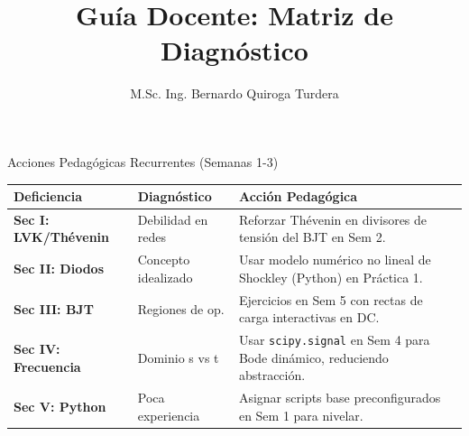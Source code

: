\documentclass[aspectratio=169]{beamer}
\title{Guía Docente: Matriz de Diagnóstico}
\author{M.Sc. Ing. Bernardo Quiroga Turdera}
\institute{Circuitos Electrónicos III}
\begin{document}
\begin{frame}{Acciones Pedagógicas Recurrentes (Semanas 1-3)}
    \small
    \begin{table}[]
        \begin{tabular}{@{}p{2.5cm}p{3cm}p{7.5cm}@{}}
            \toprule
            \textbf{Deficiencia} & \textbf{Diagnóstico} & \textbf{Acción Pedagógica} \\ \midrule
            \textbf{Sec I: LVK/Thévenin} & Debilidad en redes & Reforzar Thévenin en divisores de tensión del BJT en Sem 2. \\ 
            \textbf{Sec II: Diodos} & Concepto idealizado & Usar modelo numérico no lineal de Shockley (Python) en Práctica 1. \\ 
            \textbf{Sec III: BJT} & Regiones de op. & Ejercicios en Sem 5 con rectas de carga interactivas en DC. \\ 
            \textbf{Sec IV: Frecuencia} & Dominio s vs t & Usar \texttt{scipy.signal} en Sem 4 para Bode dinámico, reduciendo abstracción. \\ 
            \textbf{Sec V: Python} & Poca experiencia & Asignar scripts base preconfigurados en Sem 1 para nivelar. \\ \bottomrule
        \end{tabular}
    \end{table}
\end{frame}
\end{document}
